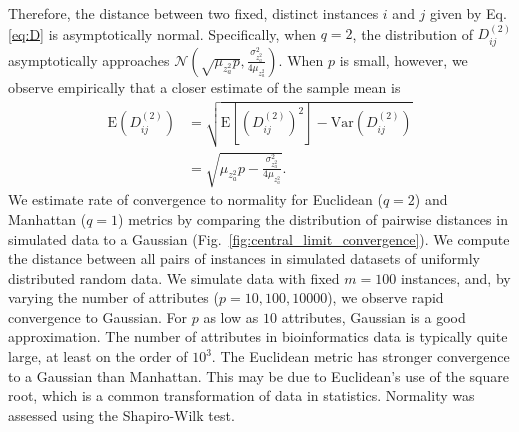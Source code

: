 \documentclass[aoas]{imsart}
\begin{document}
Therefore, the distance between two fixed, distinct instances $i$ and $j$ given by Eq. \ref{eq:D} is asymptotically normal.
Specifically, when $q = 2$, the distribution of $D_{ij}^{(2)}$ asymptotically approaches $\mathcal{N}\left(\sqrt{\mu_{z^2_a}p}, \frac{\sigma^2_{z^2_a}}{4\mu_{z^2_a}}\right)$. 
When $p$ is small, however, we observe empirically that a closer estimate of the sample mean is 
%
\begin{equation}\label{eq:DqImprovedExplained}
\begin{aligned}
\text{E}\left(D^{(2)}_{ij}\right) &= \sqrt{\text{E}\left[\left(D^{(2)}_{ij}\right)^2\right] - \text{Var}\left(D^{(2)}_{ij}\right)} \\
&= \sqrt{\mu_{z^2_a}p - \frac{\sigma^2_{z^2_a}}{4\mu_{z^2_a}}}.
\end{aligned}
\end{equation}
%
We estimate rate of convergence to normality for Euclidean ($q=2$) and Manhattan ($q=1$)  metrics by comparing the distribution of pairwise distances in simulated data to a Gaussian (Fig.~\ref{fig:central_limit_convergence}). We compute the distance between all pairs of instances in simulated datasets of uniformly distributed random data. We simulate data with fixed $m=100$ instances, and, by varying the number of attributes ($p=10,100,10000$), we observe rapid convergence to Gaussian. For $p$ as low as $10$ attributes, Gaussian is a good approximation. The number of attributes in bioinformatics data is typically quite large, at least on the order of $10^3$. The Euclidean metric has stronger convergence to a Gaussian than Manhattan. This may be due to Euclidean's use of the square root, which is a common transformation of data in statistics. Normality was assessed using the Shapiro-Wilk test. 
\end{document}
